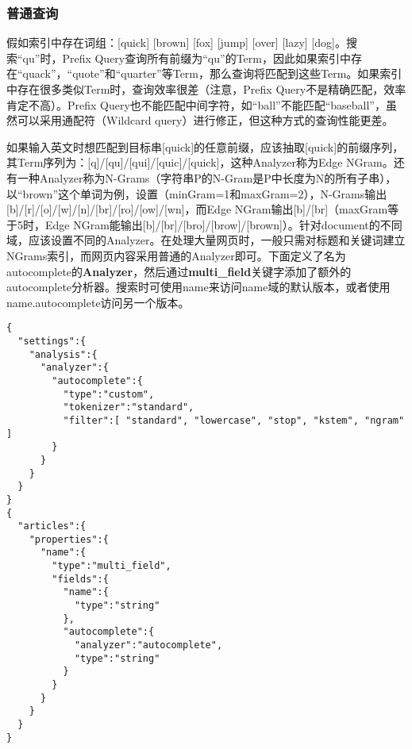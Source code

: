\subsubsection{普通查询}
\par 假如索引中存在词组：[quick] [brown] [fox] [jump] [over] [lazy] [dog]。搜索“qu”时，Prefix Query查询所有前缀为“qu”的Term，因此如果索引中存在“quack”，“quote”和“quarter”等Term，那么查询将匹配到这些Term。如果索引中存在很多类似Term时，查询效率很差（注意，Prefix Query不是精确匹配，效率肯定不高）。Prefix Query也不能匹配中间字符，如“ball”不能匹配“baseball”，虽然可以采用通配符（Wildcard query）进行修正，但这种方式的查询性能更差。
\par 如果输入英文时想匹配到目标串[quick]的任意前缀，应该抽取[quick]的前缀序列，其Term序列为：[q]/[qu]/[qui]/[quic]/[quick]，这种Analyzer称为Edge NGram。还有一种Analyzer称为N-Grams（字符串P的N-Gram是P中长度为N的所有子串），以“brown”这个单词为例，设置（minGram=1和maxGram=2），N-Grams输出[b]/[r]/[o]/[w]/[n]/[br]/[ro]/[ow]/[wn]，而Edge NGram输出[b]/[br]（maxGram等于5时，Edge NGram能输出[b]/[br]/[bro]/[brow]/[brown]）。针对document的不同域，应该设置不同的Analyzer。在处理大量网页时，一般只需对标题和关键词建立NGrams索引，而网页内容采用普通的Analyzer即可。下面定义了名为autocomplete的\textbf{Analyzer}，然后通过\textbf{multi\_field}关键字添加了额外的autocomplete分析器。搜索时可使用name来访问name域的默认版本，或者使用name.autocomplete访问另一个版本。
\begin{verbatim}
{
  "settings":{
    "analysis":{
      "analyzer":{
        "autocomplete":{
          "type":"custom",
          "tokenizer":"standard",
          "filter":[ "standard", "lowercase", "stop", "kstem", "ngram" ] 
        }
      }
    }
  }
}
{
  "articles":{
    "properties":{
      "name":{
        "type":"multi_field",
        "fields":{
          "name":{
            "type":"string"
          },
          "autocomplete":{
            "analyzer":"autocomplete",
            "type":"string"
          }
        }
      }
    }
  }
}
\end{verbatim}
